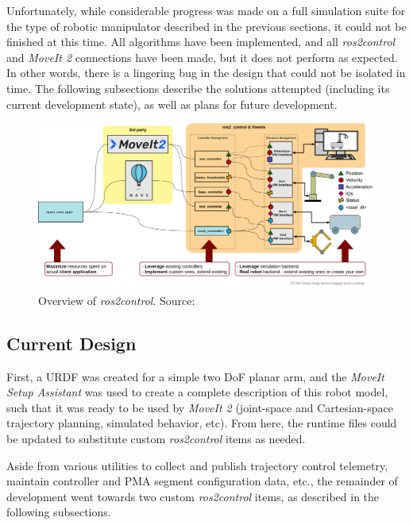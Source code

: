 \documentclass[conference]{IEEEtran}
\begin{document}
	Unfortunately, while considerable progress was made on a full simulation suite for the type of robotic manipulator described in the previous sections, it could not be finished at this time. All algorithms have been implemented, and all \textit{ros2\textunderscore control} and \textit{MoveIt 2} connections have been made, but it does not perform as expected. In other words, there is a lingering bug in the design that could not be isolated in time. The following subsections describe the solutions attempted (including its current development state), as well as plans for future development.
	
	\begin{figure}[htbp]
		\label{fig:ros2_control_overview}
		\centerline{\includegraphics[width=2.0\columnwidth]{images/ros2_control_overview.png}}
		\caption{Overview of \textit{ros2\textunderscore control}. Source: \cite{ros2-control-overview}}
	\end{figure}

	\subsection{Current Design}

	First, a URDF was created for a simple two \ac{DoF} planar arm, and the \textit{MoveIt Setup Assistant} was used to create a complete description of this robot model, such that it was ready to be used by \textit{MoveIt 2} (joint-space and Cartesian-space trajectory planning, simulated behavior, etc). From here, the runtime files could be updated to substitute custom \textit{ros2\textunderscore control} items as needed.

	Aside from various utilities to collect and publish trajectory control telemetry, maintain controller and \ac{PMA} segment configuration data, etc., the remainder of development went towards two custom \textit{ros2\textunderscore control} items, as described in the following subsections.
\end{document}
